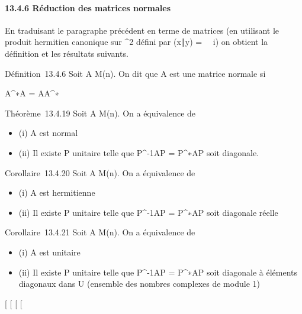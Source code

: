 \paragraph{13.4.6 Réduction des matrices normales}

En traduisant le paragraphe précédent en terme de matrices (en utilisant
le produit hermitien canonique sur ^2 défini par
(x∣y) =\
\sum ~
i\overlinexiyi) on
obtient la définition et les résultats suivants.

Définition~13.4.6 Soit A \in M(n). On dit que A est une matrice
normale si

A^∗A = AA^∗

Théorème~13.4.19 Soit A \in M(n). On a équivalence de

\begin{itemize}
\itemsep1pt\parskip0pt
\item
  (i) A est normal
\item
  (ii) Il existe P unitaire telle que P^-1AP =
  P^∗AP soit diagonale.
\end{itemize}

Corollaire~13.4.20 Soit A \in M(n). On a équivalence de

\begin{itemize}
\itemsep1pt\parskip0pt
\item
  (i) A est hermitienne
\item
  (ii) Il existe P unitaire telle que P^-1AP =
  P^∗AP soit diagonale réelle
\end{itemize}

Corollaire~13.4.21 Soit A \in M(n). On a équivalence de

\begin{itemize}
\itemsep1pt\parskip0pt
\item
  (i) A est unitaire
\item
  (ii) Il existe P unitaire telle que P^-1AP =
  P^∗AP soit diagonale à éléments diagonaux dans U (ensemble
  des nombres complexes de module 1)
\end{itemize}

{[}
{[}
{[}
{[}
